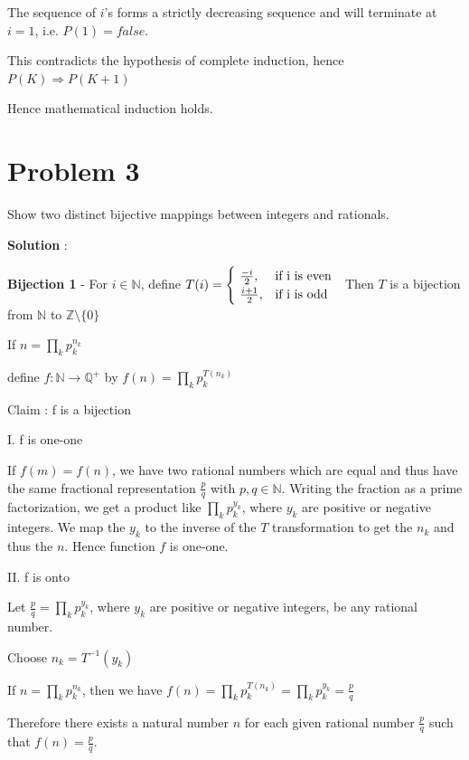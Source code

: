 \documentclass{article}
\begin{document}
    \quad The sequence of $i$’s forms a strictly decreasing sequence and will terminate at $i = 1$, i.e. $P(1) = false$.

    \quad This contradicts the hypothesis of complete induction, hence $P(K) \Longrightarrow P(K + 1)$
    
    \quad Hence mathematical induction holds.
    
    \section*{Problem 3} Show two distinct bijective mappings between integers and rationals.
    
    \textbf{Solution} : 
    
\quad \textbf{Bijection 1} - For $i \in \mathbb{N}$, define $T(i)=\begin{cases}
                ~\frac{-i}{2}, & \hbox{if i is even} \\
               ~\frac{i+1}{2}, & \hbox{if i is odd}
            \end{cases}$ ~Then $T$ is a bijection from $\mathbb{N}$ to $\mathbb{Z}\setminus\{0\}$

    \quad If $n = \prod_{k}p_k^{n_k}$
    
    \quad define $f: \mathbb{N}\rightarrow \mathbb{Q^+}$ by $f(n)=\prod_{k}p_k^{T(n_k)}$
    
    \quad Claim : f is a bijection
    
    \quad I. f is one-one
    
    \qquad If $f(m) = f(n)$, we have two rational numbers which are equal and thus have the same fractional representation $\frac{p}{q}$ with $p,q \in \mathbb{N}$. Writing the fraction as a prime factorization, we get a product like $\prod_{k}p_k^{y_k}$, where $y_k$ are positive or negative integers. We map the $y_k$ to the inverse of the $T$ transformation to get the $n_k$ and thus the $n$. Hence function $f$ is one-one.
    
    \quad II. f is onto
    
    \qquad Let $\frac{p}{q}=\prod_{k}p_k^{y_k}$, where $y_k$ are positive or negative integers, be any rational number. 
    
    \qquad Choose $n_k = T^{-1}(y_k)$ 
    
    \qquad If $n=\prod_{k}p_k^{n_k}$, then we have $f(n)=\prod_{k}p_k^{T(n_k)}=\prod_{k}p_k^{y_k}=\frac{p}{q}$ 
    
    \qquad Therefore there exists a natural number $n$ for each given rational number $\frac{p}{q}$ such that $f(n)=\frac{p}{q}$. 
    
\end{document}
